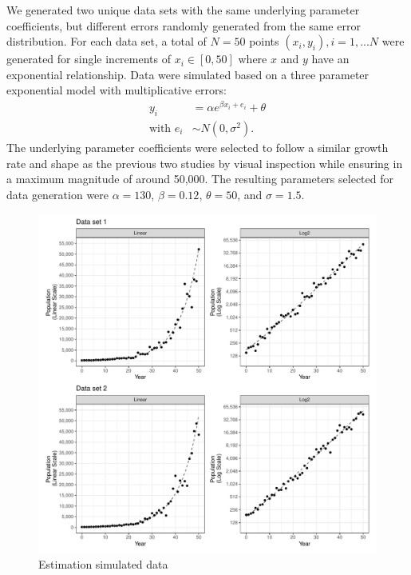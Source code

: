 \documentclass[print]{nuthesis}
\begin{document}
We generated two unique data sets with the same underlying parameter coefficients, but different errors randomly generated from the same error distribution.
For each data set, a total of \(N = 50\) points \((x_i, y_i), i = 1,...N\) were generated for single increments of \(x_i\in [0, 50]\) where \(x\) and \(y\) have an exponential relationship.
Data were simulated based on a three parameter exponential model with multiplicative errors:
\begin{align}
y_i & = \alpha e^{\beta x_i + e_i} + \theta \\
\text{with } e_i & \sim N(0, \sigma^2). \nonumber
\end{align}
The underlying parameter coefficients were selected to follow a similar growth rate and shape as the previous two studies by visual inspection while ensuring in a maximum magnitude of around 50,000.
The resulting parameters selected for data generation were \(\alpha = 130\), \(\beta = 0.12\), \(\theta = 50\), and \(\sigma = 1.5\).

\begin{figure}[tbp]

{\centering \includegraphics[width=1\linewidth,]{thesis_files/figure-latex/estimation-simulated-data-1} 

}

\caption{Estimation simulated data}\label{fig:estimation-simulated-data}
\end{figure}
\end{document}
